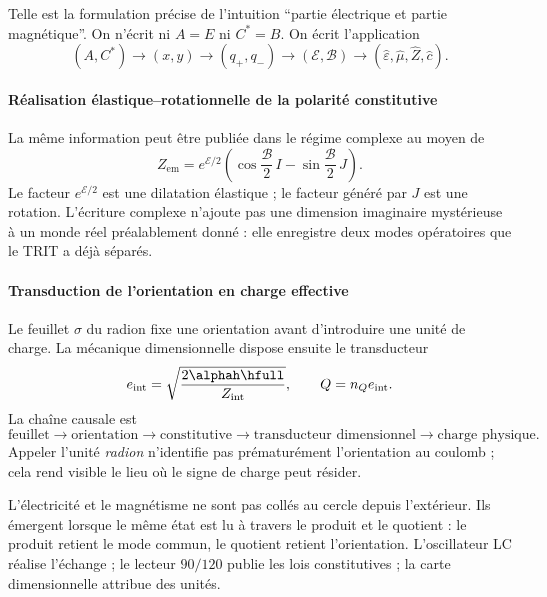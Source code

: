 Telle est la formulation précise de l'intuition \enquote{partie électrique et
partie magnétique}. On n'écrit ni \(A=E\) ni \(C^*=B\). On écrit l'application
\[
(A,C^*)\to(x,y)\to(q_+,q_-)
\to(\mathcal E,\mathcal B)
\to(\widehat\varepsilon,\widehat\mu,\widehat Z,\widehat c).
\]

\paragraph{Réalisation élastique--rotationnelle de la polarité constitutive}

La même information peut être publiée dans le régime complexe au moyen de
\begin{equation}
Z_{\mathrm{em}}=e^{\mathcal E/2}
\left(\cos\frac{\mathcal B}{2}\,I
-\sin\frac{\mathcal B}{2}\,J\right).
\label{eq:Zem}
\end{equation}
Le facteur \(e^{\mathcal E/2}\) est une dilatation élastique ; le facteur généré
par \(J\) est une rotation. L'écriture complexe n'ajoute pas une dimension
imaginaire mystérieuse à un monde réel préalablement donné : elle enregistre deux modes
opératoires que le TRIT a déjà séparés.

\paragraph{Transduction de l'orientation en charge effective}

Le feuillet \(\sigma\) du radion fixe une orientation avant d'introduire une
unité de charge. La mécanique dimensionnelle dispose ensuite le transducteur
\[
e_{\mathrm{int}}=\sqrt{\frac{2\alphah\hfull}{Z_{\mathrm{int}}}},
\qquad
Q=n_Qe_{\mathrm{int}}.
\]
La chaîne causale est
\[
\text{feuillet}\to\text{orientation}\to\text{constitutive}
\to\text{transducteur dimensionnel}\to\text{charge physique}.
\]
Appeler l'unité \emph{radion} n'identifie pas prématurément l'orientation
au coulomb ; cela rend visible le lieu où le signe de charge peut résider.

\begin{narrativebox}
L'électricité et le magnétisme ne sont pas collés au cercle depuis l'extérieur. Ils émergent
lorsque le même état est lu à travers le produit et le quotient : le produit
retient le mode commun, le quotient retient l'orientation. L'oscillateur LC
réalise l'échange ; le lecteur \(90/120\) publie les lois constitutives ; la
carte dimensionnelle attribue des unités.
\end{narrativebox}
